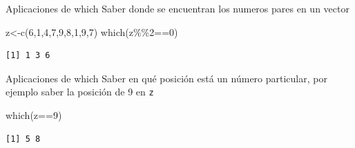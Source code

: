 \documentclass[
  ignorenonframetext,
  aspectratio=169,
  spanish,
]{beamer}
\newenvironment{Shaded}{\begin{snugshade}}{\end{snugshade}}
\newcommand{\DecValTok}[1]{\textcolor[rgb]{0.68,0.00,0.00}{#1}}
\newcommand{\FunctionTok}[1]{\textcolor[rgb]{0.28,0.35,0.67}{#1}}
\newcommand{\NormalTok}[1]{\textcolor[rgb]{0.00,0.23,0.31}{#1}}
\newcommand{\OtherTok}[1]{\textcolor[rgb]{0.00,0.23,0.31}{#1}}
\newcommand{\SpecialCharTok}[1]{\textcolor[rgb]{0.37,0.37,0.37}{#1}}
\begin{document}
\begin{frame}[fragile]{Aplicaciones de which}
\label{aplicaciones-de-which}
Saber donde se encuentran los numeros pares en un vector

\begin{Shaded}
\begin{Highlighting}[]
\NormalTok{z}\OtherTok{\textless{}{-}}\FunctionTok{c}\NormalTok{(}\DecValTok{6}\NormalTok{,}\DecValTok{1}\NormalTok{,}\DecValTok{4}\NormalTok{,}\DecValTok{7}\NormalTok{,}\DecValTok{9}\NormalTok{,}\DecValTok{8}\NormalTok{,}\DecValTok{1}\NormalTok{,}\DecValTok{9}\NormalTok{,}\DecValTok{7}\NormalTok{)}
\FunctionTok{which}\NormalTok{(z}\SpecialCharTok{\%\%}\DecValTok{2}\SpecialCharTok{==}\DecValTok{0}\NormalTok{)}
\end{Highlighting}
\end{Shaded}

\begin{verbatim}
[1] 1 3 6
\end{verbatim}
\end{frame}

\begin{frame}[fragile]{Aplicaciones de which}
\label{aplicaciones-de-which-1}
Saber en qué posición está un número particular, por ejemplo saber la
posición de 9 en \texttt{z}

\begin{Shaded}
\begin{Highlighting}[]
\FunctionTok{which}\NormalTok{(z}\SpecialCharTok{==}\DecValTok{9}\NormalTok{)}
\end{Highlighting}
\end{Shaded}

\begin{verbatim}
[1] 5 8
\end{verbatim}
\end{frame}
\end{document}
